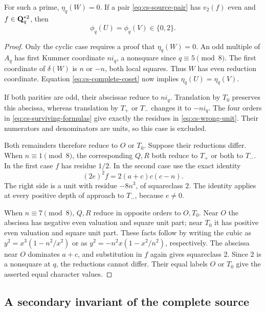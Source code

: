 \begin{lemma}\label{lem:cs-odd-row}
For such a prime, $\eta_q(W)=0$.  If a pair
\eqref{eq:cs-source-pair} has $v_2(f)$ even and $f\in\mathbf Q_q^{*2}$, then
\[
 \phi_q(U)=\phi_q(V)\in\{0,2\}.
\]
\end{lemma}
\begin{proof}
Only the cyclic case requires a proof that $\eta_q(W)=0$.  An odd
multiple of $A_q$ has first Kummer coordinate $ni_q$, a nonsquare since
$q\equiv5\pmod8$.  The first coordinate of $\delta(W)$ is $n$ or $-n$,
both local squares.  Thus $W$ has even reduction coordinate.  Equation
\eqref{eq:cs-complete-coset} now implies $\eta_q(U)=\eta_q(V)$.

If both parities are odd, their abscissae reduce to $ni_q$.
Translation by $T_0$ preserves this abscissa, whereas translation by
$T_+$ or $T_-$ changes it to $-ni_q$.  The four orders in
\eqref{eq:cs-surviving-formulas} give exactly the residues in
\eqref{eq:cs-wrong-unit}.  Their numerators and denominators are units,
so this case is excluded.

Both remainders therefore reduce to $O$ or $T_0$.  Suppose their
reductions differ.  When $n\equiv1\pmod8$, the corresponding $Q,R$
both reduce to $T_+$ or both to $T_-$.  In the first case $f$ has
residue $1/2$.  In the second case use the exact identity
\[
 (2e)^2f=2(a+c)c(c-n).
\]
The right side is a unit with residue $-8n^3$, of squareclass $2$.
The identity applies at every positive depth of approach to $T_-$,
because $e\ne0$.

When $n\equiv7\pmod8$, $Q,R$ reduce in opposite orders to $O,T_0$.
Near $O$ the abscissa has negative even valuation and square unit part;
near $T_0$ it has positive even valuation and square unit part.  These
facts follow by writing the cubic as $y^2=x^3(1-n^2/x^2)$ or as
$y^2=-n^2x(1-x^2/n^2)$, respectively.  The abscissa near $O$ dominates
$a+c$, and substitution in $f$ again gives squareclass $2$.  Since $2$
is a nonsquare at $q$, the reductions cannot differ.  Their equal labels
$O$ or $T_0$ give the asserted equal character values.
\end{proof}

\subsection{A secondary invariant of the complete source}

